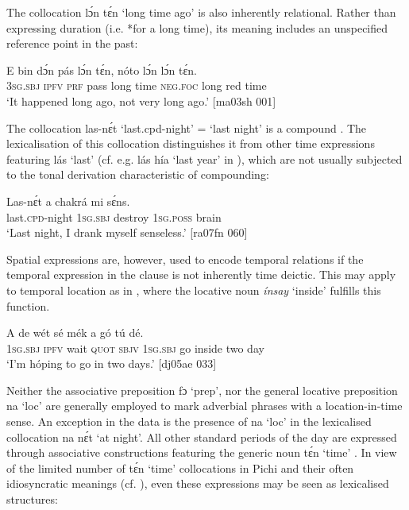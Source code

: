 The collocation lɔ́n tɛ́n ‘long time ago’ is also inherently relational. Rather than expressing duration (i.e. *for a long time), its meaning includes an unspecified reference point in the past:



\ea%
    \label{ex:key:1017}
    \gll E    bin  dɔ́n  pás  lɔ́n  tɛ́n,    nóto  lɔ́n    lɔ́n  tɛ́n.\\
\textsc{3sg.sbj}  \textsc{ipfv}  \textsc{prf}  pass  long  time    \textsc{neg}.\textsc{foc}  long    red  time\\

\glt ‘It happened long ago, not very long ago.’ [ma03sh 001]
\z

The collocation las-nɛ́t ‘last.cpd-night’ = ‘last night’ is a compound . The lexicalisation of this collocation distinguishes it from other time expressions featuring lás ‘last’ (cf. e.g. lás hía ‘last year’ in ), which are not usually subjected to the tonal derivation characteristic of compounding{\fff}: 


\ea%
    \label{ex:key:1018}
    \gll Las-nɛ́t    a    chakrá  mi    sɛ́ns.\\
last.\textsc{cpd}{}-night  \textsc{1sg.sbj}  destroy  \textsc{1sg.poss}  brain\\

\glt ‘Last night, I drank myself senseless.’ [ra07fn 060]
\z

Spatial expressions are, however, used to encode temporal relations if the temporal expression in the clause is not inherently time deictic. This may apply to temporal location as in , where the locative noun\textit{ ínsay} ‘inside’ fulfills this function. 


\ea%
    \label{ex:key:1019}
    \gll A    de  wét  sé    mék  a    gó    tú  dé.\\
\textsc{1sg.sbj}  \textsc{ipfv}  wait  \textsc{quot}    \textsc{sbjv}  \textsc{1sg.sbj}  go  inside  two  day\\

\glt ‘I’m hóping to go in two days.’ [dj05ae 033]
\z

Neither the associative preposition{\fff} fɔ ‘prep’, nor the general locative preposition{\fff} na ‘loc’ are generally employed to mark adverbial phrases with a location-in-time sense. An exception in the data is the presence of na ‘loc’ in the lexicalised collocation na nɛ́t ‘at night’{\fff}. All other standard periods of the day are expressed through associative constructions featuring the generic noun{\fff} tɛ́n ‘time’ . In view of the limited number of tɛ́n ‘time’ collocations in Pichi and their often idiosyncratic meanings (cf. ), even these expressions may be seen as lexicalised structures:{\fff}


